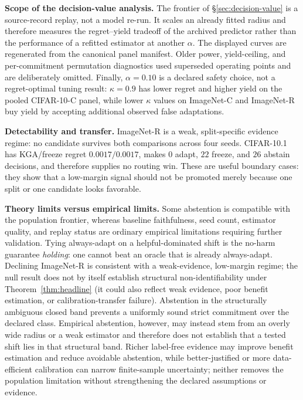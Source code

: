 \textbf{Scope of the decision-value analysis.} The frontier of \S\ref{sec:decision-value} is a
source-record replay, not a model re-run. It scales an already fitted radius and therefore measures
the regret--yield tradeoff of the archived predictor rather than the performance of a refitted
estimator at another $\alpha$. The displayed curves are regenerated from the canonical panel
manifest. Older power, yield-ceiling, and per-commitment permutation diagnostics used superseded
operating points and are deliberately omitted. Finally, $\alpha{=}0.10$ is a declared safety choice,
not a regret-optimal tuning result: $\kappa{=}0.9$ has lower regret and higher yield on the pooled
CIFAR-10-C panel, while lower $\kappa$ values on ImageNet-C and ImageNet-R buy yield by accepting
additional observed false adaptations.

\textbf{Detectability and transfer.} ImageNet-R is a weak, split-specific evidence regime: no
candidate survives both comparisons across four seeds. CIFAR-10.1 has KGA/freeze regret
$0.0017/0.0017$, makes $0$ adapt, $22$ freeze, and $26$ abstain decisions, and therefore supplies no
routing win. These are useful boundary cases: they show that a low-margin signal should not be
promoted merely because one split or one candidate looks favorable.

\textbf{Theory limits versus empirical limits.} Some abstention is compatible with the population
frontier, whereas baseline faithfulness, seed count, estimator quality, and replay status are ordinary
empirical limitations requiring further validation. Tying always-adapt on a helpful-dominated shift is the no-harm
guarantee \emph{holding}: one cannot beat an oracle that is already always-adapt. Declining
ImageNet-R is consistent with a weak-evidence, low-margin regime; the null result does not by itself
establish structural non-identifiability under Theorem~\ref{thm:headline} (it could also reflect weak
evidence, poor benefit estimation, or calibration-transfer failure). Abstention in the structurally
ambiguous closed band prevents a uniformly sound strict commitment over the declared class. Empirical
abstention, however, may instead stem from an overly wide radius or a weak estimator and therefore does
not establish that a tested shift lies in that structural band. Richer label-free evidence may improve
benefit estimation and reduce avoidable abstention, while better-justified or more data-efficient
calibration can narrow finite-sample uncertainty; neither removes the population limitation without
strengthening the declared assumptions or evidence.

